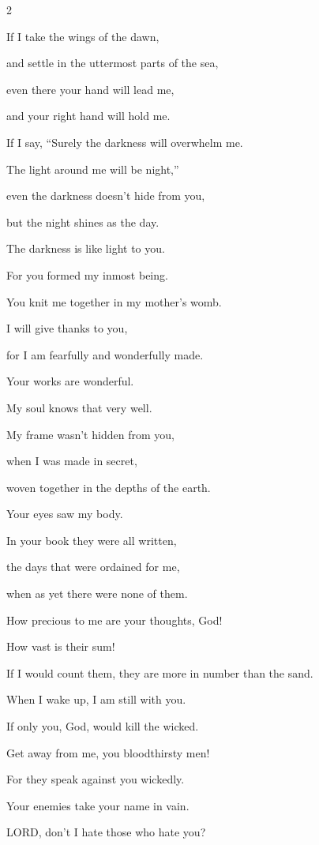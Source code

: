 \begin{multicols}{2}
	
	\myverse{}If I take the wings of the dawn,
	
	and settle in the uttermost parts of the sea,
	
	
	\myverse{}even there your hand will lead me,
	
	and your right hand will hold me.
	
	
	\myverse{}If I say, “Surely the darkness will overwhelm me.
	
	The light around me will be night,”
	
	
	\myverse{}even the darkness doesn’t hide from you,
	
	but the night shines as the day.
	
	The darkness is like light to you.
	
	
	\myverse{}For you formed my inmost being.
	
	You knit me together in my mother’s womb.
	
	
	\myverse{}I will give thanks to you,
	
	for I am fearfully and wonderfully made.
	
	Your works are wonderful.
	
	My soul knows that very well.
	
	
	\myverse{}My frame wasn’t hidden from you,
	
	when I was made in secret,
	
	woven together in the depths of the earth.
	
	
	\myverse{}Your eyes saw my body.
	
	In your book they were all written,
	
	the days that were ordained for me,
	
	when as yet there were none of them.
	
	
	\myverse{}How precious to me are your thoughts, God!
	
	How vast is their sum!
	
	
	\myverse{}If I would count them, they are more in number than the sand.
	
	When I wake up, I am still with you.
	
	
	\myverse{}If only you, God, would kill the wicked.
	
	Get away from me, you bloodthirsty men!
	
	
	\myverse{}For they speak against you wickedly.
	
	Your enemies take your name in vain.
	
	
	\myverse{}LORD, don’t I hate those who hate you?
	

\end{multicols}
